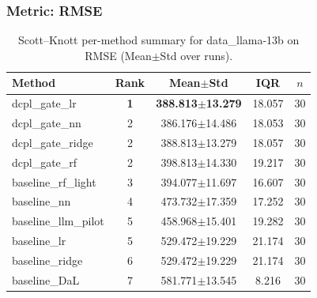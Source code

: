 \subsubsection*{Metric: RMSE}
\begin{table}[H]
\centering
\scriptsize
\setlength{\tabcolsep}{4pt}
\renewcommand{\arraystretch}{1.1}
\caption{Scott--Knott per-method summary for data\_llama-13b on RMSE (Mean$\pm$Std over runs).}
\label{tab:sk_data_llama-13b_RMSE}
\begin{tabular}{l|c|c|c|c}
\hline
\textbf{Method} & \textbf{Rank} & \textbf{Mean$\pm$Std} & \textbf{IQR} & \textbf{$n$} \\
\hline
\rowcolor{red!15} dcpl\_gate\_lr & \textbf{1} & \textbf{388.813$\pm$13.279} & 18.057 & 30 \\
dcpl\_gate\_nn & 2 & 386.176$\pm$14.486 & 18.053 & 30 \\
dcpl\_gate\_ridge & 2 & 388.813$\pm$13.279 & 18.057 & 30 \\
dcpl\_gate\_rf & 2 & 398.813$\pm$14.330 & 19.217 & 30 \\
baseline\_rf\_light & 3 & 394.077$\pm$11.697 & 16.607 & 30 \\
baseline\_nn & 4 & 473.732$\pm$17.359 & 17.252 & 30 \\
baseline\_llm\_pilot & 5 & 458.968$\pm$15.401 & 19.282 & 30 \\
baseline\_lr & 5 & 529.472$\pm$19.229 & 21.174 & 30 \\
baseline\_ridge & 6 & 529.472$\pm$19.229 & 21.174 & 30 \\
baseline\_DaL & 7 & 581.771$\pm$13.545 & 8.216 & 30 \\
\hline
\end{tabular}
\end{table}


